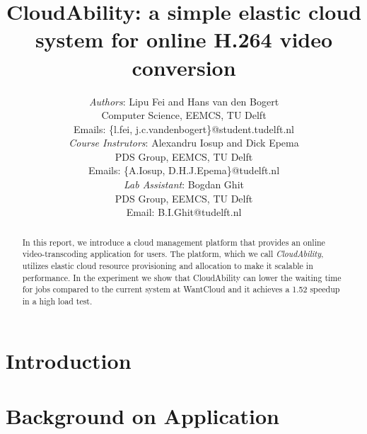 \documentclass[10pt, a4paper, twoside, twocolumn, technote]{IEEEtran}
\begin{document}
\newcommand{\staterunning}
  {\textsc{running}}
\newcommand{\statepending}
  {\textsc{pending}}
  
\newcommand{\statefinished}
  {\textsc{finished}}
\newcommand{\statefailed}
  {\textsc{failed}}
  
\newcommand{\policystatic}
  {\textsc{static}}
\newcommand{\policysimpleelastic}
  {\textsc{simple elastic}}


\title{CloudAbility: a simple elastic cloud system for
       online H.264 video conversion}
\author{\textit{Authors}: Lipu Fei and Hans van den Bogert\\
  Computer Science, EEMCS, TU Delft\\
  Emails: \{l.fei, j.c.vandenbogert\}@student.tudelft.nl\\
  \textit{Course Instrutors}: Alexandru Iosup and Dick Epema\\
  PDS Group, EEMCS, TU Delft\\
  Emails: \{A.Iosup, D.H.J.Epema\}@tudelft.nl\\
  \textit{Lab Assistant}: Bogdan Ghit\\
  PDS Group, EEMCS, TU Delft\\
  Email: B.I.Ghit@tudelft.nl}

\maketitle

\begin{abstract}
  In this report, we introduce a cloud management platform that
  provides an online video-transcoding application for users. The
  platform, which we call \emph{CloudAbility}, utilizes elastic cloud
  resource provisioning and allocation to make it scalable in
  performance. In the experiment we show that CloudAbility can lower
  the waiting time for jobs compared to the current system at
  WantCloud and it achieves a 1.52 speedup in a high load test.
\end{abstract}

\section{Introduction}


\section{Background on Application}\label{background}

\end{document}
